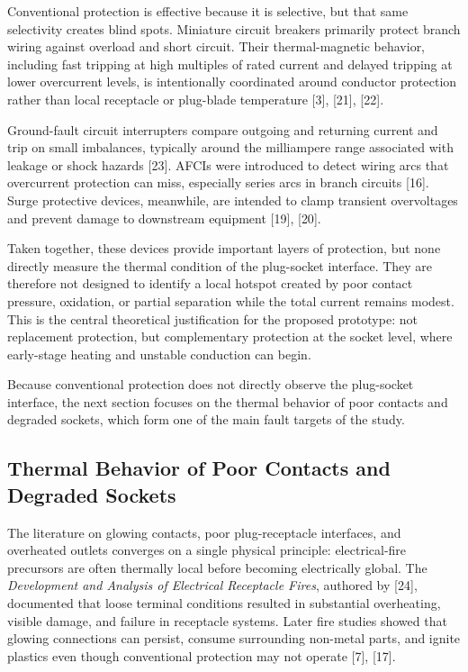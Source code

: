 Conventional protection is effective because it is selective, but that
same selectivity creates blind spots. Miniature circuit breakers
primarily protect branch wiring against overload and short circuit.
Their thermal-magnetic behavior, including fast tripping at high
multiples of rated current and delayed tripping at lower overcurrent
levels, is intentionally coordinated around conductor protection rather
than local receptacle or plug-blade temperature {[}3{]}, {[}21{]},
{[}22{]}.

Ground-fault circuit interrupters compare outgoing and returning current
and trip on small imbalances, typically around the milliampere range
associated with leakage or shock hazards {[}23{]}. AFCIs were introduced
to detect wiring arcs that overcurrent protection can miss, especially
series arcs in branch circuits {[}16{]}. Surge protective devices,
meanwhile, are intended to clamp transient overvoltages and prevent
damage to downstream equipment {[}19{]}, {[}20{]}.

Taken together, these devices provide important layers of protection,
but none directly measure the thermal condition of the plug-socket
interface. They are therefore not designed to identify a local hotspot
created by poor contact pressure, oxidation, or partial separation while
the total current remains modest. This is the central theoretical
justification for the proposed prototype: not replacement protection,
but complementary protection at the socket level, where early-stage
heating and unstable conduction can begin.

Because conventional protection does not directly observe the
plug-socket interface, the next section focuses on the thermal behavior
of poor contacts and degraded sockets, which form one of the main fault
targets of the study.

\subsection{Thermal Behavior of Poor Contacts and Degraded Sockets}\label{thermal-behavior-of-poor-contacts-and-degraded-sockets}

The literature on glowing contacts, poor plug-receptacle interfaces, and
overheated outlets converges on a single physical principle:
electrical-fire precursors are often thermally local before becoming
electrically global. The \textit{Development and Analysis of Electrical
Receptacle Fires}, authored by {[}24{]}, documented that loose terminal
conditions resulted in substantial overheating, visible damage, and
failure in receptacle systems. Later fire studies showed that glowing
connections can persist, consume surrounding non-metal parts, and ignite
plastics even though conventional protection may not operate {[}7{]},
{[}17{]}.

